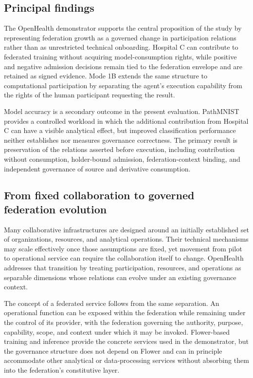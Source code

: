 \documentclass[twoside,11pt]{article}
\begin{document}
\subsection{Principal findings}

The OpenHealth demonstrator supports the central proposition of the study by representing federation growth as a governed change in participation relations rather than as unrestricted technical onboarding. Hospital C can contribute to federated training without acquiring model-consumption rights, while positive and negative admission decisions remain tied to the federation envelope and are retained as signed evidence. Mode 1B extends the same structure to computational participation by separating the agent's execution capability from the rights of the human participant requesting the result.

Model accuracy is  a secondary outcome in the present evaluation. PathMNIST provides a controlled workload in which the additional contribution from Hospital C can have a visible analytical effect, but improved classification performance neither establishes nor measures governance correctness. The primary result is preservation of the relations asserted before execution, including contribution without consumption, holder-bound admission, federation-context binding, and independent governance of source and derivative consumption.

\subsection{From fixed collaboration to governed federation evolution}

Many collaborative infrastructures are designed around an initially established set of organizations, resources, and analytical operations. Their technical mechanisms may scale effectively once those assumptions are fixed, yet movement from pilot to operational service can require the collaboration itself to change. OpenHealth addresses that transition by treating participation, resources, and operations as separable dimensions whose relations can evolve under an existing governance context.

The concept of a federated service follows from the same separation. An operational function can be exposed within the federation while remaining under the control of its provider, with the federation governing the authority, purpose, capability, scope, and context under which it may be invoked. Flower-based training and inference provide the concrete services used in the demonstrator, but the governance structure does not depend on Flower and can in principle accommodate other analytical or data-processing services without absorbing them into the federation's constitutive layer.
\end{document}
